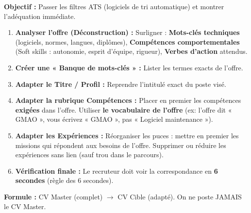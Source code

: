 \documentclass[11pt]{article}
\newcommand{\cle}[1]{{\popxbold\color{popdark}#1}}
\begin{document}
\begin{methode}
    \textbf{Objectif :} Passer les filtres ATS (logiciels de tri automatique) et montrer l'adéquation immédiate.
    \begin{enumerate}
        \item \textbf{Analyser l'offre (Déconstruction) :} Surligner : \textbf{Mots-clés techniques} (logiciels, normes, langues, diplômes), \textbf{Compétences comportementales} (Soft skills : autonomie, esprit d'équipe, rigueur), \textbf{Verbes d'action} attendus.
        \item \textbf{Créer une « Banque de mots-clés » :} Lister les termes exacts de l'offre.
        \item \textbf{Adapter le Titre / Profil :} Reprendre l'intitulé exact du poste visé.
        \item \textbf{Adapter la rubrique Compétences :} Placer en premier les compétences \textbf{exigées} dans l'offre. Utiliser \textbf{le vocabulaire de l'offre} (ex: l'offre dit « GMAO », vous écrivez « GMAO », pas « Logiciel maintenance »).
        \item \textbf{Adapter les Expériences :} Réorganiser les puces : mettre en premier les missions qui répondent aux besoins de l'offre. Supprimer ou réduire les expériences sans lien (sauf trou dans le parcours).
        \item \textbf{Vérification finale :} Le recruteur doit voir la correspondance en \textbf{6 secondes} (règle des 6 secondes).
    \end{enumerate}
    \textbf{Formule :} \cle{CV Master (complet) $\to$ CV Cible (adapté)}. On ne poste JAMAIS le CV Master.
\end{methode}
\end{document}
